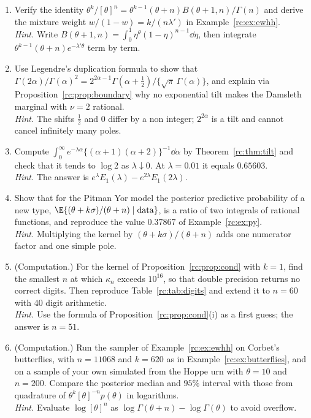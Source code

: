 \begin{enumerate}[label=\arabic*.,leftmargin=*,itemsep=4pt]
\item Verify the identity $\theta^k/[\theta]^n=\theta^{k-1}(\theta+n)B(\theta+1,n)/\Gamma(n)$ and derive the mixture weight $w/(1-w)=k/(n\lambda')$ in Example~\ref{rc:ex:ewhh}.\\
\emph{Hint.} Write $B(\theta+1,n)=\int_0^1\eta^\theta(1-\eta)^{n-1}\dd\eta$, then integrate $\theta^{k-1}(\theta+n)e^{-\lambda'\theta}$ term by term.

\item Use Legendre's duplication formula to show that $\Gamma(2\alpha)/\Gamma(\alpha)^2=2^{2\alpha-1}\Gamma(\alpha+\frac12)/\{\sqrt\pi\,\Gamma(\alpha)\}$, and explain via Proposition~\ref{rc:prop:boundary} why no exponential tilt makes the Damsleth marginal with $\nu=2$ rational.\\
\emph{Hint.} The shifts $\frac12$ and $0$ differ by a non integer; $2^{2\alpha}$ is a tilt and cannot cancel infinitely many poles.

\item Compute $\int_0^\infty e^{-\lambda\alpha}\{(\alpha+1)(\alpha+2)\}^{-1}\dd\alpha$ by Theorem~\ref{rc:thm:tilt} and check that it tends to $\log2$ as $\lambda\downarrow0$. At $\lambda=0.01$ it equals $0.65603$.\\
\emph{Hint.} The answer is $e^{\lambda}E_1(\lambda)-e^{2\lambda}E_1(2\lambda)$.

\item Show that for the Pitman Yor model the posterior predictive probability of a new type, $\E\{(\theta+k\sigma)/(\theta+n)\mid\text{data}\}$, is a ratio of two integrals of rational functions, and reproduce the value $0.37867$ of Example~\ref{rc:ex:py}.\\
\emph{Hint.} Multiplying the kernel by $(\theta+k\sigma)/(\theta+n)$ adds one numerator factor and one simple pole.

\item (Computation.) For the kernel of Proposition~\ref{rc:prop:cond} with $k=1$, find the smallest $n$ at which $\kappa_n$ exceeds $10^{16}$, so that double precision returns no correct digits. Then reproduce Table~\ref{rc:tab:digits} and extend it to $n=60$ with 40 digit arithmetic.\\
\emph{Hint.} Use the formula of Proposition~\ref{rc:prop:cond}(i) as a first guess; the answer is $n=51$.

\item (Computation.) Run the sampler of Example~\ref{rc:ex:ewhh} on Corbet's butterflies, with $n=11068$ and $k=620$ as in Example~\ref{rc:ex:butterflies}, and on a sample of your own simulated from the Hoppe urn with $\theta=10$ and $n=200$. Compare the posterior median and $95\%$ interval with those from quadrature of $\theta^{k}[\theta]^{-n}p(\theta)$ in logarithms.\\
\emph{Hint.} Evaluate $\log[\theta]^n$ as $\log\Gamma(\theta+n)-\log\Gamma(\theta)$ to avoid overflow.


\end{enumerate}
